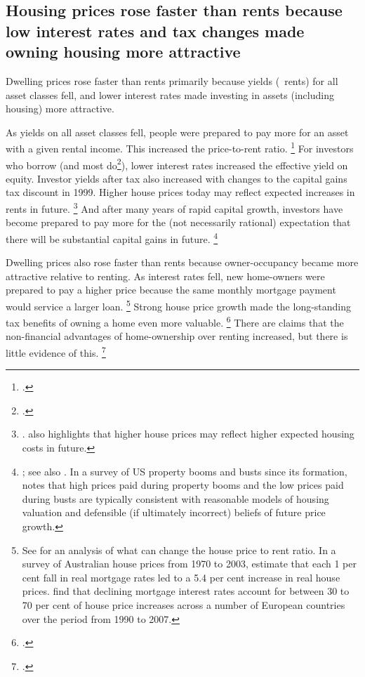 \subsection{Housing prices rose faster than rents because low interest rates and tax changes made owning housing more attractive}\label{subsec:housing-prices-rose-faster-than-rents-because-tax-changes-and-low-interest-rates-made-owner-occupancy-and-housing-investment-more-attractive}

Dwelling prices rose faster than rents primarily because yields (\ie~rents) for all asset classes fell, and lower interest rates made investing in assets (including housing) more attractive.

As yields on all asset classes fell, people were prepared to pay more for an asset with a given rental income. This increased the price-to-rent ratio.%
	\footcites[][Figure~7]{HousingAus17}{Andre2010birds}{hatzviottorents2008}
For investors who borrow (and most do\footcite[][Figure~9]{DaleyWood2016-Negative-Gearing-CGT}), lower interest rates increased the effective yield on equity.
Investor yields after tax also increased with changes to the capital gains tax discount in 1999. Higher house prices today may reflect expected increases in rents in future.%
	\footnote{\textcite{Bracke2015houseprices}. \textcite{Lowe-national-balance-sheet-speech} also highlights that higher house prices may reflect higher expected housing costs in future.}
And after many years of rapid capital growth, investors have become prepared to pay more for the (not necessarily rational) expectation that there will be substantial capital gains in future.%
	\footnote{\textcite{FoxTulip2014overvalued}; see also \textcite{KishnorMorley2015}.
	In a survey of US property booms and busts since its formation, \textcite[][3]{Glaeser-2013-Natio-of-gamblers} notes that high prices paid during property booms and the low prices paid during busts are typically consistent with reasonable models of housing valuation and defensible (if ultimately incorrect) beliefs of future price growth.}

Dwelling prices also rose faster than rents because owner-occupancy became more attractive relative to renting.
As interest rates fell, new home-owners were prepared to pay a higher price because the same monthly mortgage payment would service a larger loan.%
	\footnote{See \textcites{Sommeretal-2010}{Andre2010birds} for an analysis of what can change the house price to rent ratio.
    In a survey of Australian house prices from 1970 to 2003, \textcite{Abelsonetal2005} estimate that each 1 per cent fall in real mortgage rates led to a 5.4 per cent increase in real house prices.
    \textcite{Miles-Pillonca-2008} find that declining mortgage interest rates account for between 30 to 70 per cent of house price increases across a number of European countries over the period from 1990 to 2007.}
Strong house price growth made the long-standing tax benefits of owning a home
even more valuable.
	\footcite{KellyHarrisonHunterEtAl2013}
There are claims that the non-financial advantages of home-ownership over renting increased, but there is little evidence of this.%
	\footcite{FoxTulip2014overvalued}

